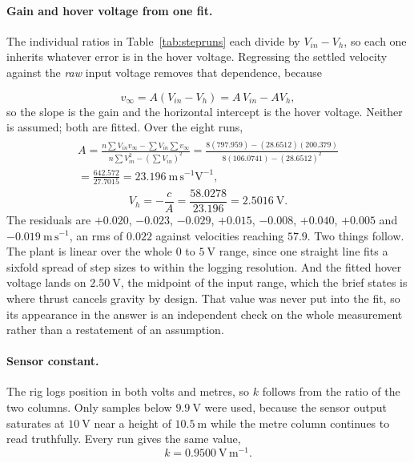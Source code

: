 \paragraph{Gain and hover voltage from one fit.} The individual ratios in
Table~\ref{tab:stepruns} each divide by $V_{in} - V_h$, so each one inherits whatever error is in
the hover voltage. Regressing the settled velocity against the \emph{raw} input voltage removes
that dependence, because

\begin{equation}
    v_\infty = A\left(V_{in} - V_h\right) = A\,V_{in} - A V_h ,
\end{equation}
so the slope is the gain and the horizontal intercept is the hover voltage. Neither is assumed;
both are fitted. Over the eight runs,
\begin{align}\label{eqn:gain_regression}\begin{split}
    A = \frac{n\sum V_{in}v_\infty - \sum V_{in} \sum v_\infty}
             {n \sum V_{in}^2 - \left(\sum V_{in}\right)^2}
      = \frac{8(797.959) - (28.6512)(200.379)}{8(106.0741) - (28.6512)^2} \\
      = \frac{642.572}{27.7015}
      = 23.196\ \mathrm{m\,s^{-1}V^{-1}} ,
\end{split}\end{align}
\begin{equation}
    V_h = -\frac{c}{A} = \frac{58.0278}{23.196} = 2.5016\ \mathrm{V} .
\end{equation}
The residuals are $+0.020$, $-0.023$, $-0.029$, $+0.015$, $-0.008$, $+0.040$, $+0.005$ and
$-0.019\ \mathrm{m\,s^{-1}}$, an rms of $0.022$ against velocities reaching $57.9$. Two things
follow. The plant is linear over the whole $0$ to $5\ \mathrm{V}$ range, since one straight line
fits a sixfold spread of step sizes to within the logging resolution. And the fitted hover voltage
lands on $2.50\ \mathrm{V}$, the midpoint of the input range, which the brief states is where
thrust cancels gravity by design. That value was never put into the fit, so its appearance in the
answer is an independent check on the whole measurement rather than a restatement of an
assumption.

\paragraph{Sensor constant.} The rig logs position in both volts and metres, so $k$ follows from
the ratio of the two columns. Only samples below $9.9\ \mathrm{V}$ were used, because the sensor
output saturates at $10\ \mathrm{V}$ near a height of $10.5\ \mathrm{m}$ while the metre column
continues to read truthfully. Every run gives the same value,
\begin{equation}
    k = 0.9500\ \mathrm{V\,m^{-1}} .
\end{equation}

